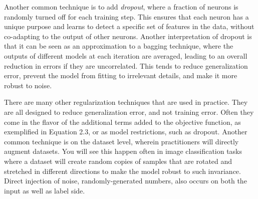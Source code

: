 Another common technique is to add \textit{dropout}, where a fraction of neurons is randomly turned off for each training step.
This ensures that each neuron has a unique purpose and learns to detect a specific set of features in the data, without co-adapting to the output of other neurons.
Another interpretation of dropout is that it can be seen as an approximation to a bagging technique, where the outputs of different models at each iteration are averaged, leading to an overall reduction in errors if they are uncorrelated.
This tends to reduce generalization error, prevent the model from fitting to irrelevant details, and make it more robust to noise.

There are many other regularization techniques that are used in practice. They are all designed to reduce
generalization error, and not training error. Often they come in the flavor of the additional terms added to the
objective function, as exemplified in Equation 2.3, or as model restrictions, such as dropout. Another common technique
is on the dataset level, wherein practitioners will directly augment datasets. You will see this happen often in image classification
tasks where a dataset will create random copies of samples that are rotated and stretched in different directions to make
the model robust to such invariance. Direct injection of noise, randomly-generated numbers, also occurs on both the input
as well as label side. 
